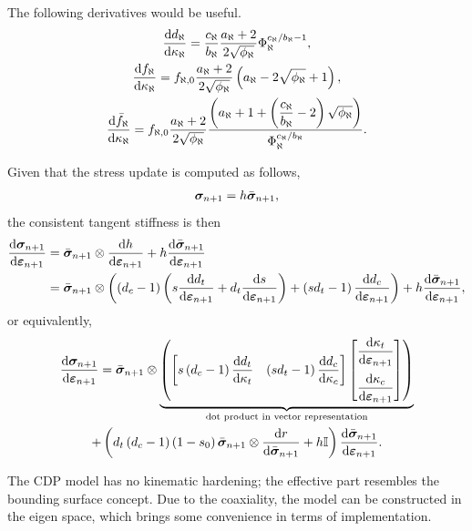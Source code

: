 The following derivatives would be useful.
\begin{gather}
\dfrac{\mathrm{d}d_\aleph}{\mathrm{d}\kappa_\aleph}=\dfrac{c_\aleph}{b_\aleph}\dfrac{a_\aleph+2}{2\sqrt{\phi_\aleph}}\Phi_\aleph^{c_\aleph/b_\aleph-1},\\
\dfrac{\mathrm{d}f_\aleph}{\mathrm{d}\kappa_\aleph}=f_{\aleph,0}\dfrac{a_\aleph+2}{2\sqrt{\phi_\aleph}}\left(a_\aleph-2\sqrt{\phi_\aleph}+1\right),\\
\dfrac{\mathrm{d}\bar{f}_\aleph}{\mathrm{d}\kappa_\aleph}=f_{\aleph,0}\dfrac{a_\aleph+2}{2\sqrt{\phi_\aleph}}\dfrac{\left(a_\aleph+1+\left(\dfrac{c_\aleph}{b_\aleph}-2\right)\sqrt{\phi_\aleph}\right)}{\Phi_\aleph^{c_\aleph/b_\aleph}}.
\end{gather}

Given that the stress update is computed as follows,
\begin{gather}
\bm{\sigma}_{n+1}=h\bar{\bm{\sigma}}_{n+1},
\end{gather}
the consistent tangent stiffness is then
\begin{gather}
\begin{split}
\dfrac{\mathrm{d}\bm{\sigma}_{n+1}}{\mathrm{d}\bm{\varepsilon}_{n+1}}&=\bar{\bm{\sigma}}_{n+1}\otimes\dfrac{\mathrm{d}h}{\mathrm{d}\bm{\varepsilon}_{n+1}}+h\dfrac{\mathrm{d}\bar{\bm{\sigma}}_{n+1}}{\mathrm{d}\bm{\varepsilon}_{n+1}}\\
&=\bar{\bm{\sigma}}_{n+1}\otimes\left(\left(d_c-1\right)\left(s\dfrac{\mathrm{d}d_t}{\mathrm{d}\bm{\varepsilon}_{n+1}}+d_t\dfrac{\mathrm{d}s}{\mathrm{d}\bm{\varepsilon}_{n+1}}\right)+\left(sd_t-1\right)\dfrac{\mathrm{d}d_c}{\mathrm{d}\bm{\varepsilon}_{n+1}}\right)+h\dfrac{\mathrm{d}\bar{\bm{\sigma}}_{n+1}}{\mathrm{d}\bm{\varepsilon}_{n+1}},
\end{split}
\end{gather}
or equivalently,
\begin{multline}\label{eq:cdp_pd}
\dfrac{\mathrm{d}\bm{\sigma}_{n+1}}{\mathrm{d}\bm{\varepsilon}_{n+1}}=\bar{\bm{\sigma}}_{n+1}\otimes\underbrace{\left(\begin{bmatrix}
s\left(d_c-1\right)\dfrac{\mathrm{d}d_t}{\mathrm{d}\kappa_t}&
\left(sd_t-1\right)\dfrac{\mathrm{d}d_c}{\mathrm{d}\kappa_c}
\end{bmatrix}
\begin{bmatrix}
\dfrac{\mathrm{d}\kappa_t}{\mathrm{d}\bm{\varepsilon}_{n+1}}\\[4mm]
\dfrac{\mathrm{d}\kappa_c}{\mathrm{d}\bm{\varepsilon}_{n+1}}
\end{bmatrix}\right)}_\text{dot product in vector representation}\\+\left(d_t\left(d_c-1\right)\left(1-s_0\right)\bar{\bm{\sigma}}_{n+1}\otimes\dfrac{\mathrm{d}r}{\mathrm{d}\bar{\bm{\sigma}}_{n+1}}+h\mathbb{I}\right)\dfrac{\mathrm{d}\bar{\bm{\sigma}}_{n+1}}{\mathrm{d}\bm{\varepsilon}_{n+1}}.
\end{multline}

The CDP model has no kinematic hardening; the effective part resembles the bounding surface concept.
Due to the coaxiality, the model can be constructed in the eigen space, which brings some convenience in terms of implementation.
